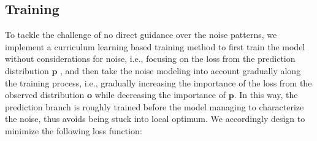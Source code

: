 
\subsection{Training}
To tackle the challenge of no direct guidance over the noise patterns, 
we implement a curriculum learning based training method to  
first train the model without considerations for noise, i.e., focusing on the loss from the prediction distribution $\mathbf{p}$ ,  and then take the noise modeling into account gradually along the training process, i.e., gradually increasing the importance of the loss from the observed distribution $\mathbf{o}$ while decreasing the importance of $\mathbf{p}$. In this way, the prediction branch is roughly trained before the model managing to characterize the noise, thus avoids being stuck into local optimum. 
We accordingly design to minimize  the following loss function:
%
